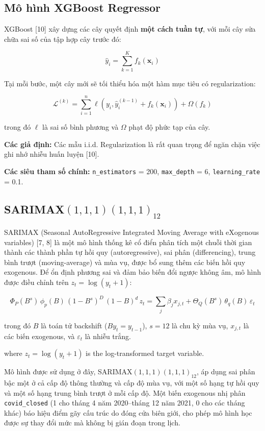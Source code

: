 \documentclass[
]{article}
\begin{document}
\subsection{Mô hình XGBoost
Regressor}\label{muxf4-huxecnh-xgboost-regressor}

XGBoost {[}10{]} xây dựng các cây quyết định \textbf{một cách tuần tự},
với mỗi cây sửa chữa sai số của tập hợp cây trước đó:

\[\hat{y}_i = \sum_{k=1}^{K} f_k(\mathbf{x}_i)\]

Tại mỗi bước, một cây mới sẽ tối thiểu hóa một hàm mục tiêu có
regularization:

\[\mathcal{L}^{(k)} = \sum_{i=1}^{n} \ell(y_i, \hat{y}_i^{(k-1)} + f_k(\mathbf{x}_i)) + \Omega(f_k)\]

trong đó \(\ell\) là sai số bình phương và \(\Omega\) phạt độ phức tạp
của cây.

\textbf{Các giả định:} Các mẫu i.i.d. Regularization là rất quan trọng
để ngăn chặn việc ghi nhớ nhiễu huấn luyện {[}10{]}.

\textbf{Các siêu tham số chính:} \texttt{n\_estimators} = 200,
\texttt{max\_depth} = 6, \texttt{learning\_rate} = 0.1.

\subsection{\texorpdfstring{SARIMAX\((1,1,1)(1,1,1)_{12}\)}{SARIMAX(1,1,1)(1,1,1)\_\{12\}}}\label{sarimax111111_12}

SARIMAX (Seasonal AutoRegressive Integrated Moving Average with
eXogenous variables) {[}7, 8{]} là một mô hình thống kê cổ điển phân
tích một chuỗi thời gian thành các thành phần tự hồi quy
(autoregressive), sai phân (differencing), trung bình trượt
(moving-average) và mùa vụ, được bổ sung thêm các biến hồi quy
exogenous. Để ổn định phương sai và đảm bảo biến đổi ngược không âm, mô
hình được điều chỉnh trên \(z_t = \log(y_t + 1)\):

\[\Phi_P(B^s)\,\phi_p(B)\,(1-B^s)^D\,(1-B)^d\, z_t = \sum_{j} \beta_j x_{j,t} + \Theta_Q(B^s)\,\theta_q(B)\,\varepsilon_t\]

trong đó \(B\) là toán tử backshift (\(B y_t = y_{t-1}\)), \(s = 12\) là
chu kỳ mùa vụ, \(x_{j,t}\) là các biến exogenous, và \(\varepsilon_t\)
là nhiễu trắng.

where \(z_t = \log(y_t + 1)\) is the log-transformed target variable.

Mô hình được sử dụng ở đây, SARIMAX\((1,1,1)(1,1,1)_{12}\), áp dụng sai
phân bậc một ở cả cấp độ thông thường và cấp độ mùa vụ, với một số hạng
tự hồi quy và một số hạng trung bình trượt ở mỗi cấp độ. Một biến
exogenous nhị phân \texttt{covid\_closed} (1 cho tháng 4 năm 2020--tháng
12 năm 2021, 0 cho các tháng khác) báo hiệu điểm gãy cấu trúc do đóng
cửa biên giới, cho phép mô hình học được sự thay đổi mức mà không bị
gián đoạn trong lịch.
\end{document}
